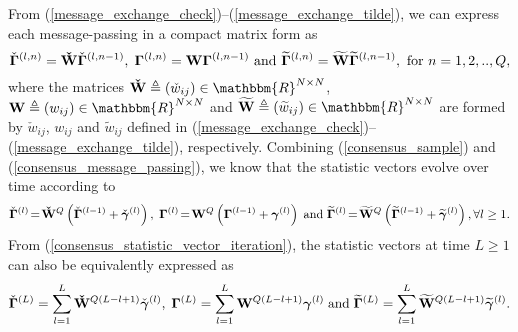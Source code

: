 \documentclass[11pt, draftclsnofoot, onecolumn]{IEEEtran}
\newcommand{\bgamma}{{\boldsymbol{\gamma}}}
\newcommand{\cbgamma}{{\check{\boldsymbol{\gamma}}}}
\newcommand{\tbgamma}{{\widetilde{\boldsymbol{\gamma}}}}
\newcommand{\bGamma}{{\boldsymbol{\Gamma}}}
\newcommand{\cbGamma}{{\check{\boldsymbol{\Gamma}}}}
\newcommand{\tbGamma}{{\widetilde{\boldsymbol{\Gamma}}}}
\newcommand{\cw}{{\check{w}}}
\newcommand{\tw}{{\widetilde{w}}}
\newcommand{\cW}{{\check{W}}}
\newcommand{\tW}{{\widetilde{W}}}
\begin{document}
From (\ref{message_exchange_check})--(\ref{message_exchange_tilde}), we can express each message-passing in a compact matrix form as
\begin{equation} \label{consensus_message_passing}
{\cbGamma ^{\left( {l,n} \right)}} = {\bf{\cW}}{\cbGamma ^{\left( {l,n - 1} \right)}}, \; {\bGamma ^{\left( {l,n} \right)}} = {\bf{W}}{\bGamma ^{\left( {l,n - 1} \right)}} \text{ and } {\tbGamma ^{\left( {l,n} \right)}} = {\bf{\tW}}{\tbGamma ^{\left( {l,n - 1} \right)}}, \text{ for } n=1,2,..,Q,
\end{equation}
where the matrices ${\bf{\cW}} \triangleq \left( {{\cw_{ij}}} \right) \in {{\mathbbm{R}}^{N \times N}}$, ${\bf{W}} \triangleq \left( {{w_{ij}}} \right) \in {{\mathbbm{R}}^{N \times N}}$ and ${\bf{\tW}} \triangleq \left( {{\tw_{ij}}} \right) \in {{\mathbbm{R}}^{N \times N}}$ are formed by $\cw_{ij}$, $w_{ij}$ and $\tw_{ij}$ defined in (\ref{message_exchange_check})--(\ref{message_exchange_tilde}), respectively. Combining (\ref{consensus_sample}) and (\ref{consensus_message_passing}), we know that the statistic vectors evolve over time according to
\begin{equation} \label{consensus_statistic_vector_iteration}
{\cbGamma ^{\left( l \right)}} \! = \! {{\bf{\cW}}^Q}\left( {{\cbGamma ^{\left( {l - 1} \right)}} + {\cbgamma ^{(l)}}} \right), \;  {\bGamma ^{\left( l \right)}} \! =\!  {{\bf{W}}^Q}\left( {{\bGamma ^{\left( {l - 1} \right)}} + {\bgamma ^{(l)}}} \right) \; \text{and} \; {\tbGamma ^{\left( l \right)}} \! = \! {{\bf{\tW}}^Q}\left( {{\tbGamma ^{\left( {l - 1} \right)}} + {\tbgamma ^{(l)}}} \right),  \forall  l \ge 1.
\end{equation}
From (\ref{consensus_statistic_vector_iteration}), the statistic vectors at time $L \ge 1$ can also be equivalently expressed as
\begin{equation} \label{consensus_statistic_vector_time_evolving}
{\cbGamma ^{\left( L \right)}} = \sum\limits_{l = 1}^L {{{\bf{\cW}}^{Q\left( {L - l + 1} \right)}}{\cbgamma ^{(l)}}}, \; {\bGamma ^{\left( L \right)}} = \sum\limits_{l = 1}^L {{{\bf{W}}^{Q\left( {L - l + 1} \right)}}{\bgamma ^{(l)}}} \; \text{and} \; {\tbGamma ^{\left( L \right)}} = \sum\limits_{l = 1}^L {{{\bf{\tW}}^{Q\left( {L - l + 1} \right)}}{\tbgamma ^{(l)}}}.
\end{equation}
\end{document}
